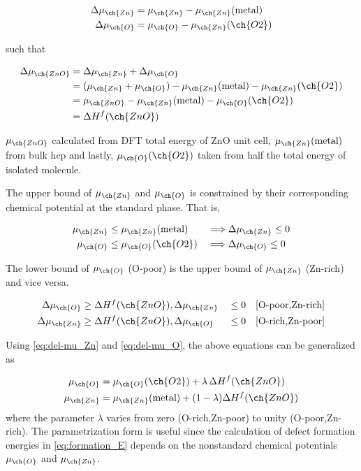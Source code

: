 \begin{align}
    \Delta \mu_{\ch{Zn}} &= \mu_{\ch{Zn}} - \mu_{\ch{Zn}}(\text{metal}) \label{eq:del-mu_Zn} \\
    \Delta \mu_{\ch{O}}  &= \mu_{\ch{O}} - \mu_{\ch{Zn}}(\ch{O2}) \label{eq:del-mu_O}
\end{align}

such that 

\begin{align}
    \Delta \mu_{\ch{ZnO}} &= \Delta \mu_{\ch{Zn}} +   \Delta \mu_{\ch{O}} \\
    &= (\mu_{\ch{Zn}} + \mu_{\ch{O}}) - \mu_{\ch{Zn}}(\text{metal}) - \mu_{\ch{Zn}}(\ch{O2}) \\
    &= \mu_{\ch{ZnO}} - \mu_{\ch{Zn}}(\text{metal}) - \mu_{\ch{O}}(\ch{O2}) \\
    &= \Delta H^f (\ch{ZnO})
\end{align}

$\mu_{\ch{ZnO}}$ calculated from DFT total energy of ZnO unit cell, $\mu_{\ch{Zn}}(\text{metal})$ from bulk hcp  and lastly, $\mu_{\ch{O}}(\ch{O2})$ taken from half the total energy of isolated  molecule. 

The upper bound of $\mu_{\ch{Zn}}$ and  $\mu_{\ch{O}}$ is constrained by their corresponding chemical potential at the standard phase. That is, 

\begin{alignat}{2}
    \mu_{\ch{Zn}} &\leq \mu_{\ch{Zn}}(\text{metal}) &&\Longrightarrow \Delta \mu_{\ch{Zn}} \leq 0 \\
    \mu_{\ch{O}} &\leq \mu_{\ch{O}}(\ch{O2}) &&\Longrightarrow \Delta \mu_{\ch{O}} \leq 0
\end{alignat}

The lower bound of $\mu_{\ch{O}}$ (O-poor) is the upper bound of $\mu_{\ch{Zn}}$ (Zn-rich) and vice versa.

\begin{alignat}{2}
    \Delta \mu_{\ch{O}} &\geq \Delta H^f (\ch{ZnO}), \Delta \mu_{\ch{Zn}} &&\leq 0 \quad [\text{O-poor,Zn-rich}]\\ 
    \Delta \mu_{\ch{Zn}} &\geq \Delta H^f (\ch{ZnO}), \Delta \mu_{\ch{O}} &&\leq 0 \quad [\text{O-rich,Zn-poor}]
\end{alignat}

Using \eqref{eq:del-mu_Zn} and \eqref{eq:del-mu_O}, the above equations can be generalized as

\begin{align}
    \mu_{\ch{O}} &= \mu_{\ch{O}}(\ch{O2}) + \lambda\, \Delta H^f (\ch{ZnO}) \\ 
    \mu_{\ch{Zn}} &= \mu_{\ch{Zn}}(\text{metal}) + (1 - \lambda) \Delta H^f (\ch{ZnO})
\end{align}
where the parameter $\lambda$ varies from zero (O-rich,Zn-poor) to unity (O-poor,Zn-rich). The parametrization form is useful since the calculation of defect formation energies in \eqref{eq:formation_E} depends on the nonstandard chemical potentials $\mu_{\ch{O}}$ and $\mu_{\ch{Zn}}$.

